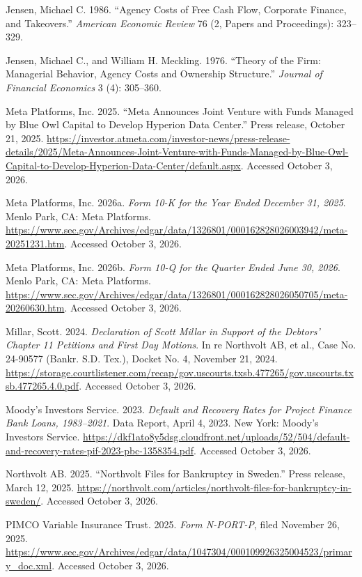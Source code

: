 \begin{sources}
\item Jensen, Michael C. 1986. ``Agency Costs of Free Cash Flow, Corporate Finance, and Takeovers.'' \textit{American Economic Review} 76 (2, Papers and Proceedings): 323--329.
\item Jensen, Michael C., and William H. Meckling. 1976. ``Theory of the Firm: Managerial Behavior, Agency Costs and Ownership Structure.'' \textit{Journal of Financial Economics} 3 (4): 305--360.
\item Meta Platforms, Inc. 2025. ``Meta Announces Joint Venture with Funds Managed by Blue Owl Capital to Develop Hyperion Data Center.'' Press release, October 21, 2025. \url{https://investor.atmeta.com/investor-news/press-release-details/2025/Meta-Announces-Joint-Venture-with-Funds-Managed-by-Blue-Owl-Capital-to-Develop-Hyperion-Data-Center/default.aspx}. Accessed October 3, 2026.
\item Meta Platforms, Inc. 2026a. \textit{Form 10-K for the Year Ended December 31, 2025}. Menlo Park, CA: Meta Platforms. \url{https://www.sec.gov/Archives/edgar/data/1326801/000162828026003942/meta-20251231.htm}. Accessed October 3, 2026.
\item Meta Platforms, Inc. 2026b. \textit{Form 10-Q for the Quarter Ended June 30, 2026}. Menlo Park, CA: Meta Platforms. \url{https://www.sec.gov/Archives/edgar/data/1326801/000162828026050705/meta-20260630.htm}. Accessed October 3, 2026.
\item Millar, Scott. 2024. \textit{Declaration of Scott Millar in Support of the Debtors' Chapter 11 Petitions and First Day Motions}. In re Northvolt AB, et al., Case No. 24-90577 (Bankr. S.D. Tex.), Docket No. 4, November 21, 2024. \url{https://storage.courtlistener.com/recap/gov.uscourts.txsb.477265/gov.uscourts.txsb.477265.4.0.pdf}. Accessed October 3, 2026.
\item Moody's Investors Service. 2023. \textit{Default and Recovery Rates for Project Finance Bank Loans, 1983--2021}. Data Report, April 4, 2023. New York: Moody's Investors Service. \url{https://dkf1ato8y5dsg.cloudfront.net/uploads/52/504/default-and-recovery-rates-pif-2023-pbc-1358354.pdf}. Accessed October 3, 2026.
\item Northvolt AB. 2025. ``Northvolt Files for Bankruptcy in Sweden.'' Press release, March 12, 2025. \url{https://northvolt.com/articles/northvolt-files-for-bankruptcy-in-sweden/}. Accessed October 3, 2026.
\item PIMCO Variable Insurance Trust. 2025. \textit{Form N-PORT-P}, filed November 26, 2025. \url{https://www.sec.gov/Archives/edgar/data/1047304/000109926325004523/primary_doc.xml}. Accessed October 3, 2026.

\end{sources}
